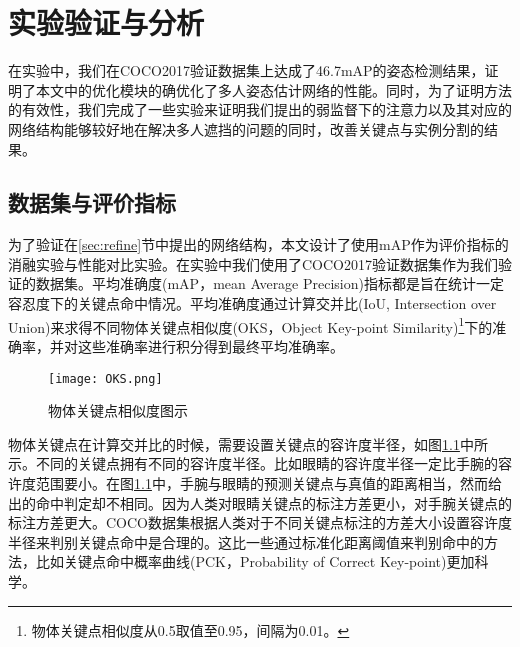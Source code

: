 \chapter{实验验证与分析}
\label{cha:exp}
在实验中，我们在COCO2017验证数据集上达成了46.7mAP的姿态检测结果，证明了本文中的优化模块的确优化了多人姿态估计网络的性能。同时，为了证明方法的有效性，我们完成了一些实验来证明我们提出的弱监督下的注意力以及其对应的网络结构能够较好地在解决多人遮挡的问题的同时，改善关键点与实例分割的结果。
\section{数据集与评价指标}
\label{sec:dataset}
为了验证在\ref{sec:refine}节中提出的网络结构，本文设计了使用mAP作为评价指标的消融实验与性能对比实验。在实验中我们使用了COCO2017验证数据集\cite{lin2014microsoft}作为我们验证的数据集。平均准确度(mAP，mean Average Precision)\cite{zhu2004recall}指标都是旨在统计一定容忍度下的关键点命中情况。平均准确度通过计算交并比(IoU, Intersection over Union)来求得不同物体关键点相似度(OKS，Object Key-point Similarity)\footnote{物体关键点相似度从0.5取值至0.95，间隔为0.01。}下的准确率，并对这些准确率进行积分得到最终平均准确率。

\begin{figure}
	\centering
	\texttt{[image: OKS.png]}
	\caption{物体关键点相似度图示\cite{ruggero2017benchmarking}}
	\label{fig:oksfigure}
\end{figure}

物体关键点在计算交并比的时候，需要设置关键点的容许度半径，如图\ref{fig:oksfigure}中所示。不同的关键点拥有不同的容许度半径。比如眼睛的容许度半径一定比手腕的容许度范围要小。在图\ref{fig:oksfigure}中，手腕与眼睛的预测关键点与真值的距离相当，然而给出的命中判定却不相同。因为人类对眼睛关键点的标注方差更小，对手腕关键点的标注方差更大。COCO数据集根据人类对于不同关键点标注的方差大小设置容许度半径来判别关键点命中是合理的。这比一些通过标准化距离阈值来判别命中的方法，比如关键点命中概率曲线\cite{andriluka20142d}(PCK，Probability of Correct Key-point)更加科学。

